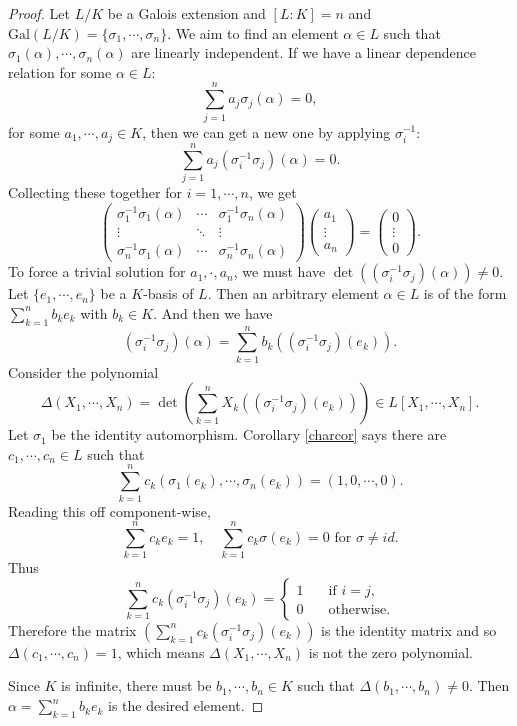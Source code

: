 \documentclass[12pt]{report}
\theoremstyle{definition}
\newcommand{\Gal}{\text{Gal}}
\begin{document}
\begin{proof}
	Let $L/K$ be a Galois extension and $[L:K]=n$ and $\Gal(L/K)=\{\sigma_1,\cdots,\sigma_n\}$. We aim to find an element $\alpha\in L$ such that $\sigma_1(\alpha),\cdots,\sigma_n(\alpha)$ are linearly independent.
	If we have a linear dependence relation for some $\alpha\in L$: $$\sum_{j=1}^n a_j\sigma_j(\alpha) = 0,$$ for some $a_1,\cdots,a_j\in K$, then we can get a new one by applying $\sigma_i^{-1}$: $$\sum_{j=1}^n a_j(\sigma_i^{-1}\sigma_j)(\alpha) = 0.$$
	Collecting these together for $i=1,\cdots,n$, we get $$\begin{pmatrix}
			\sigma_1^{-1}\sigma_1(\alpha) & \cdots & \sigma_1^{-1}\sigma_n(\alpha) \\
			\vdots                        & \ddots & \vdots                        \\
			\sigma_n^{-1}\sigma_1(\alpha) & \cdots & \sigma_n^{-1}\sigma_n(\alpha)
		\end{pmatrix} \begin{pmatrix}
			a_1    \\
			\vdots \\
			a_n
		\end{pmatrix} = \begin{pmatrix}
			0      \\
			\vdots \\
			0
		\end{pmatrix}.$$
	To force a trivial solution for $a_1,\cdot,a_n$, we must have $\det((\sigma_i^{-1}\sigma_j)(\alpha)) \not= 0.$
	Let $\{e_1,\cdots,e_n\}$ be a $K$-basis of $L$. Then an arbitrary element $\alpha\in L$ is of the form $\sum_{k=1}^n b_k e_k$ with $b_k\in K$. And then we have $$(\sigma_i^{-1}\sigma_j)(\alpha)=\sum_{k=1}^n b_k((\sigma_i^{-1}\sigma_j)(e_k)).$$
	Consider the polynomial $$\Delta(X_1,\cdots, X_n) = \det(\sum_{k=1}^n X_k((\sigma_i^{-1}\sigma_j)(e_k)))\in L[X_1,\cdots,X_n].$$
	Let $\sigma_1$ be the identity automorphism. Corollary \ref{charcor} says there are $c_1,\cdots, c_n\in L$ such that    $$\sum_{k=1}^nc_k(\sigma_1(e_k),\cdots,\sigma_n(e_k))=(1,0,\cdots,0).$$ Reading this off component-wise, $$\sum_{k=1}^n c_ke_k=1, \quad \sum_{k=1}^n c_k \sigma(e_k)=0 \mbox{ for }\sigma\not= id.$$
	Thus $$ \sum_{k=1}^n c_k (\sigma_i^{-1} \sigma_j)(e_k)=
		\begin{cases}
			1 & \quad \mbox{if } i=j,   \\
			0 & \quad \mbox{otherwise.}
		\end{cases}$$ Therefore the matrix $(\sum_{k=1}^n c_k (\sigma_i^{-1} \sigma_j)(e_k))$ is the identity matrix and so $\Delta(c_1,\cdots,c_n)  =1 $, which means $\Delta(X_1,\cdots,X_n)$ is not the zero polynomial.

	Since $K$ is infinite, there must be $b_1,\cdots, b_n\in K$ such that $\Delta(b_1,\cdots,b_n)\not=0$. Then $\alpha=\sum_{k=1}^n b_k e_k$ is the desired element.
\end{proof}
\end{document}
